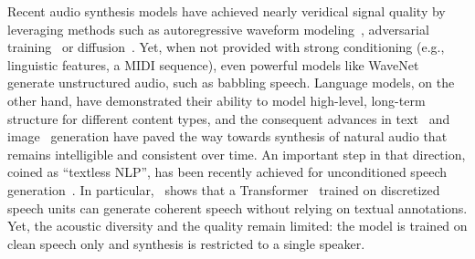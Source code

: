 \documentclass[letterpaper,10 pt]{IEEEtran}
\begin{document}
Recent audio synthesis models have achieved nearly veridical signal quality by leveraging methods such as autoregressive waveform modeling~\cite{oord2016wavenet, kalchbrenner2018wavernn}, adversarial training~\cite{kumar2019melgan, kong2020hifigan, tagliasacchi2020seanet} or diffusion~\cite{diffwave, wavegrad}. Yet, when not provided with strong conditioning (e.g., linguistic features, a MIDI sequence), even powerful models like WaveNet~\cite{oord2016wavenet} generate unstructured audio, such as babbling speech.
Language models, on the other hand, have demonstrated their ability to model high-level, long-term structure for different content types, and the consequent advances in text~\cite{gpt3, gopher, palm} and image~\cite{vit-vqgan2021, parti} generation have paved the way towards synthesis of natural audio that remains intelligible and consistent over time. An important step in that direction, coined as ``textless NLP'', has been recently achieved for unconditioned speech generation~\cite{zerospeech21, lakhotia2021generative}. In particular,~\cite{lakhotia2021generative} shows that a Transformer~\cite{attentionvaswani} trained on discretized speech units can generate coherent speech without relying on textual annotations. Yet, the acoustic diversity and the quality remain limited: the model is trained on clean speech only and synthesis is restricted to a single speaker.
\end{document}
